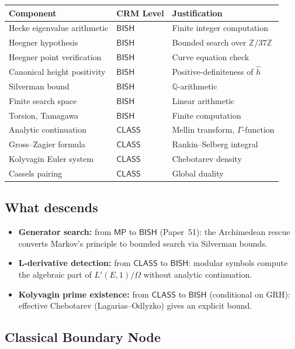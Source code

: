 \documentclass[11pt]{article}
\theoremstyle{plain}
\theoremstyle{definition}
\theoremstyle{remark}
\newcommand{\Z}{\mathbb{Z}}
\newcommand{\Q}{\mathbb{Q}}
\newcommand{\BISH}{\ensuremath{\mathsf{BISH}}}
\newcommand{\MP}{\ensuremath{\mathsf{MP}}}
\newcommand{\CLASS}{\ensuremath{\mathsf{CLASS}}}
\newcommand{\hhat}{\hat{h}}
\begin{document}
\begin{center}
\begin{tabular}{lll}
\toprule
\textbf{Component} & \textbf{CRM Level} & \textbf{Justification} \\
\midrule
Hecke eigenvalue arithmetic & $\BISH$ & Finite integer computation \\
Heegner hypothesis & $\BISH$ & Bounded search over $\Z/37\Z$ \\
Heegner point verification & $\BISH$ & Curve equation check \\
Canonical height positivity & $\BISH$ & Positive-definiteness of $\hhat$ \\
Silverman bound & $\BISH$ & $\Q$-arithmetic \\
Finite search space & $\BISH$ & Linear arithmetic \\
Torsion, Tamagawa & $\BISH$ & Finite computation \\
\midrule
Analytic continuation & $\CLASS$ & Mellin transform, $\Gamma$-function \\
Gross--Zagier formula & $\CLASS$ & Rankin--Selberg integral \\
Kolyvagin Euler system & $\CLASS$ & Chebotarev density \\
Cassels pairing & $\CLASS$ & Global duality \\
\bottomrule
\end{tabular}
\end{center}

\subsection{What descends}

\begin{itemize}[nosep]
\item \textbf{Generator search:} from $\MP$ to $\BISH$ (Paper~51): the Archimedean rescue converts Markov's principle to bounded search via Silverman bounds.
\item \textbf{L-derivative detection:} from $\CLASS$ to $\BISH$: modular symbols compute the algebraic part of $L'(E,1)/\Omega$ without analytic continuation.
\item \textbf{Kolyvagin prime existence:} from $\CLASS$ to $\BISH$ (conditional on GRH): effective Chebotarev (Lagarias--Odlyzko) gives an explicit bound.
\end{itemize}

\subsection{Classical Boundary Node}
\end{document}
